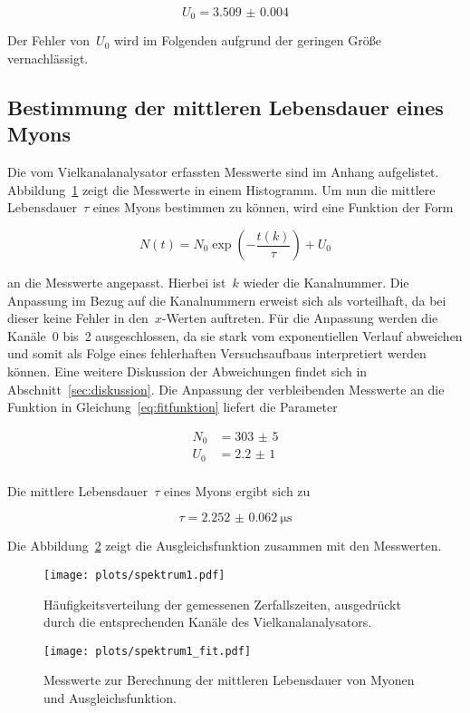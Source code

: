 \begin{equation}
  U_0=\num{3.509(4)}
  \label{eq:untergrund_kanal}
\end{equation}

Der Fehler von~$U_0$ wird im Folgenden aufgrund der geringen Größe
vernachlässigt.

\subsection{Bestimmung der mittleren Lebensdauer eines Myons}
Die vom Vielkanalanalysator erfassten Messwerte sind im Anhang aufgelistet.
Abbildung~\ref{fig:spektrum1} zeigt die Messwerte in einem Histogramm. Um nun
die mittlere Lebensdauer~$\tau$ eines Myons bestimmen zu können, wird eine Funktion
der Form

\begin{equation}
  N(t)=N_0\exp\left(-\frac{t(k)}{\tau}\right)+U_0
  \label{eq:fitfunktion}
\end{equation}

an die Messwerte angepasst. Hierbei ist~$k$ wieder die Kanalnummer. Die
Anpassung im Bezug auf die Kanalnummern erweist sich als vorteilhaft, da bei
dieser keine Fehler in den~$x$-Werten auftreten. Für die Anpassung werden die
Kanäle~\num{0} bis~\num{2} ausgeschlossen, da sie stark vom exponentiellen Verlauf
abweichen und somit als Folge eines fehlerhaften Versuchsaufbaus interpretiert
werden können. Eine weitere Diskussion der Abweichungen findet sich in
Abschnitt~\ref{sec:diskussion}. Die Anpassung der
verbleibenden Messwerte an die Funktion in Gleichung~\ref{eq:fitfunktion}
liefert die Parameter

\begin{align}
  N_0&=\num{303(5)} \\
  U_0&=\num{2.2(10)}\\
  \label{eq:fitparameter}
\end{align}

Die mittlere Lebensdauer~$\tau$ eines Myons ergibt sich zu

\begin{equation}
  \tau=\SI{2.252(62)}{\micro\second}
  \label{eq:ergebnis}
\end{equation}

Die Abbildung~\ref{fig:spektrum3} zeigt die Ausgleichsfunktion zusammen mit den
Messwerten.

\begin{figure}[htb]
  \centering
  \texttt{[image: plots/spektrum1.pdf]}
  \caption{Häufigkeitsverteilung der gemessenen Zerfallszeiten, ausgedrückt
  durch die entsprechenden Kanäle des Vielkanalanalysators.}
  \label{fig:spektrum1}
\end{figure}

\begin{figure}[htb]
  \centering
  \texttt{[image: plots/spektrum1\_fit.pdf]}
  \caption{Messwerte zur Berechnung der mittleren Lebensdauer von Myonen und
  Ausgleichsfunktion.}
  \label{fig:spektrum3}
\end{figure}

